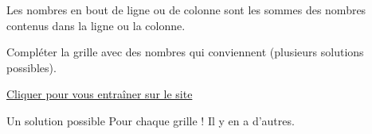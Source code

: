 \numeroteEnigme
\begin{enigme}[Yohaku]
    Les nombres en bout de ligne ou de colonne sont les sommes des nombres contenus dans la ligne ou la colonne.

    Compléter la grille avec des nombres qui conviennent (plusieurs solutions possibles).

    \hfill
    \hfill

    \href{https://coopmaths.fr/mathalea.html?ex=5R20-6,s=10,s2=1,s3=2,s4=false,n=3,i=1&v=l}{Cliquer pour vous entraîner sur le site \mathaleaLogo} 
\end{enigme}

\addtocounter{exercice}{-1}
\begin{corrige}
    Un solution possible Pour chaque grille ! Il y en a d'autres.

    \medskip
    \hfill
    \hfill

\end{corrige}